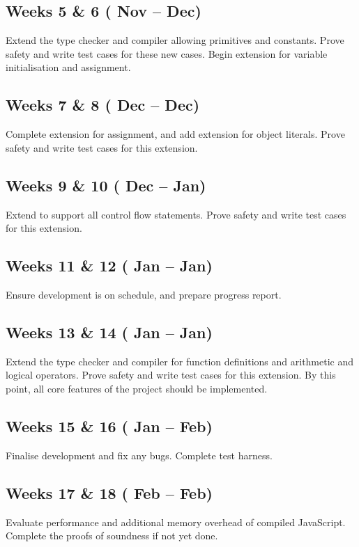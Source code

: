 \documentclass{article}
\begin{document}
		\subsection*{Weeks 5 \& 6 ( Nov --  Dec)}
		Extend the type checker and compiler allowing primitives and constants. Prove safety and write test cases for these new cases. Begin extension for variable initialisation and assignment.

		\subsection*{Weeks 7 \& 8 ( Dec --  Dec)}
		Complete extension for assignment, and add extension for object literals. Prove safety and write test cases for this extension.

		\subsection*{Weeks 9 \& 10 ( Dec --  Jan)}
		Extend to support all control flow statements. Prove safety and write test cases for this  extension.

		\subsection*{Weeks 11 \& 12 ( Jan --  Jan)}
		Ensure development is on schedule, and prepare progress report. 

		\subsection*{Weeks 13 \& 14 ( Jan --  Jan)}
		Extend the type checker and compiler for function definitions and arithmetic and logical operators. Prove safety and write test cases for this extension. By this point, all core features of the project should be implemented.

		\subsection*{Weeks 15 \& 16 ( Jan --  Feb)}
		Finalise development and fix any bugs. Complete test harness.

		\subsection*{Weeks 17 \& 18 ( Feb --  Feb)}
		Evaluate performance and additional memory overhead of compiled  JavaScript. Complete the proofs of soundness if not yet done.
\end{document}
